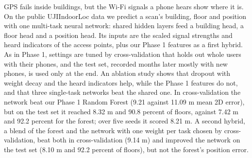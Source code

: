 GPS fails inside buildings, but the Wi-Fi signals a phone hears show where it
is. On the public UJIIndoorLoc data we predict a scan's building, floor and
position with one multi-task neural network: shared hidden layers feed a
building head, a floor head and a position head. Its inputs are the scaled
signal strengths and heard indicators of the access points, plus our Phase 1
features as a first hybrid. As in Phase 1, settings are tuned by cross-validation
that holds out whole users with their phones, and the test set, recorded months
later mostly with new phones, is used only at the end. An ablation study shows
that dropout with weight decay and the heard indicators help, while the Phase 1
features do not, and that three single-task networks beat the shared one. In
cross-validation the network beat our Phase 1 Random Forest (9.21 against 11.09
m mean 2D error), but on the test set it reached 8.32 m and 90.8 percent of
floors, against 7.42 m and 92.2 percent for the forest; over five seeds it
scored 8.21 m. A second hybrid, a blend of the forest and the network with
one weight per task chosen by cross-validation, beat both in cross-validation
(9.14 m) and improved the network on the test set (8.10 m and 92.2 percent of
floors), but not the forest's position error.
